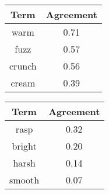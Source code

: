 \begin{tabular}{|c|c|}
	\hline
	\bf{Term} & \bf{Agreement} \tabularnewline
	\hline
	\hline
	warm & 0.71 \tabularnewline
	\hline
	fuzz & 0.57 \tabularnewline
	\hline
	crunch & 0.56 \tabularnewline
	\hline
	cream & 0.39 \tabularnewline
	\hline
\end{tabular}
\qquad
\begin{tabular}{|c|c|}
	\hline
	\bf{Term} & \bf{Agreement} \tabularnewline
	\hline
	\hline
	rasp & 0.32 \tabularnewline
	\hline
	bright & 0.20 \tabularnewline
	\hline
	harsh & 0.14 \tabularnewline
	\hline
	smooth & 0.07 \tabularnewline
	\hline
\end{tabular}
